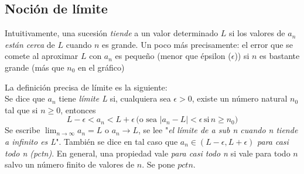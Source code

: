 \documentclass[../Teoría.root.tex]{subfiles}
\begin{document}
\subsection{Noción de límite}
Intuitivamente, una sucesión \textit{tiende} a un valor determinado \(L\) si los valores de \(a_n\) \textit{están cerca} de \(L\) cuando \(n\) es grande.
Un poco más precisamente:
el error que se comete al aproximar \(L\) con \(a_n\) es pequeño (menor que épsilon (\(\epsilon\))) si \(n\) es bastante grande (más que \(n_0\) en el gráfico)
\begin{center}
    \begin{scaletikzpicturetowidth}{\linewidth}
    \end{scaletikzpicturetowidth}
\end{center}
La definición precisa de límite es la siguiente:\\
Se dice que \(a_n\) tiene \textit{límite L} si, cualquiera sea \(\epsilon>0\), existe un número natural \(n_0\) tal que si \(n\geq0\), entonces \[L-\epsilon<a_n<L+\epsilon\,\text{(o sea \(|a_n-L|<\epsilon\,\text{si}\,n\geq n_0\))}\]
Se escribe \(\lim_{n\to\infty}a_n=L\) o \(a_n\rightarrow L\), se lee "\textit{el límite de a sub n cuando n tiende a infinito es L}".
También se dice en tal caso que \(a_n\in(L-\epsilon,L+\epsilon)\) \textit{para casi todo n (pctn)}.
En general, una propiedad vale \textit{para casi todo n} si vale para todo \(n\) salvo un número finito de valores de \(n\).
Se pone \(pctn\).
\end{document}
